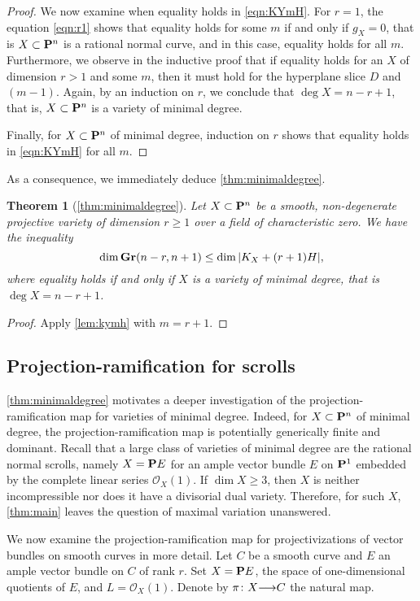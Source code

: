\documentclass[11pt,reqno]{amsart}
\theoremstyle{plain}
\newtheorem{theorem}{Theorem}[section]
\theoremstyle{definition}
\theoremstyle{remark}
\numberwithin{equation}{section}
\renewcommand{\to}{{\longrightarrow}}
\numberwithin{equation}{section}
\renewcommand{\O}{\mathcal O}
\begin{document}
\begin{proof}
  We now examine when equality holds in \eqref{eqn:KYmH}.
  For $r = 1$, the equation \eqref{eqn:r1} shows that equality holds for some $m$ if and only if $g_X = 0$, that is $X \subset \P^n$ is a rational normal curve, and in this case, equality holds for all $m$.
  Furthermore, we observe in the inductive proof that if equality holds for an $X$ of dimension $r > 1$ and some $m$, then it must hold for the hyperplane slice $D$ and $(m-1)$.
  Again, by an induction on $r$, we conclude that $\deg X = n-r+1$, that is, $X \subset \P^n$ is a variety of minimal degree.

  Finally, for $X \subset \P^n$ of minimal degree, induction on $r$ shows that equality holds in \eqref{eqn:KYmH} for all $m$.
\end{proof}

As a consequence, we immediately deduce \autoref{thm:minimaldegree}.
\begin{theorem}[\autoref{thm:minimaldegree}]
  \label{thm:actualminimaldegree}
  Let $X \subset \P^n$ be a smooth, non-degenerate projective variety of dimension $r \geq 1$ over a field of characteristic zero.
  We have the inequality
  \[ \dim \Gr(n-r, n+1) \leq \dim |K_X + (r+1)H|,\]
  where equality holds if and only if $X$ is a variety of minimal degree, that is $\deg X = n-r+1$.
\end{theorem}
\begin{proof}
  Apply \autoref{lem:kymh} with $m = r+1$.
\end{proof}

\subsection{Projection-ramification for scrolls}\label{sec:prscrolls}
\autoref{thm:minimaldegree} motivates a deeper investigation of the projection-ramification map for varieties of minimal degree.
Indeed, for $X \subset \P^n$ of minimal degree, the projection-ramification map is potentially generically finite and dominant.
Recall that a large class of varieties of minimal degree are the rational normal scrolls, namely $X = \P E$ for an ample vector bundle $E$ on $\P^1$ embedded by the complete linear series $\O_X(1)$.
If $\dim X \geq 3$, then $X$ is neither incompressible nor does it have a divisorial dual variety.
Therefore, for such $X$, \autoref{thm:main} leaves the question of maximal variation unanswered.

We now examine the projection-ramification map for projectivizations of vector bundles on smooth curves in more detail.
Let $C$ be a smooth curve and $E$ an ample vector bundle on $C$ of rank $r$.
Set $X = \P E$, the space of one-dimensional quotients of $E$, and $L = \O_X(1)$.
Denote by $\pi \from X \to C$ the natural map.
\end{document}
